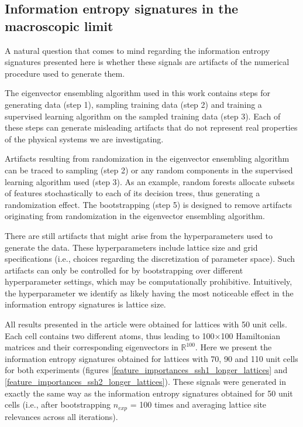 \documentclass[fleqn,10pt]{wlscirep}
\begin{document}
\subsection*{Information entropy signatures in the macroscopic limit}

A natural question that comes to mind regarding the information entropy signatures presented here is whether these signals are artifacts of the numerical procedure used to generate them.

The eigenvector ensembling algorithm used in this work contains steps for generating data (step 1), sampling training data (step 2) and training a supervised learning algorithm on the sampled training data (step 3). Each of these steps can generate misleading artifacts that do not represent real properties of the physical systems we are investigating.

Artifacts resulting from randomization in the eigenvector ensembling algorithm can be traced to sampling (step 2) or any random components in the supervised learning algorithm used (step 3). As an example, random forests allocate subsets of features stochastically to each of its decision trees, thus generating a randomization effect. The bootstrapping (step 5) is designed to remove artifacts originating from randomization in the eigenvector ensembling algorithm.

There are still artifacts that might arise from the hyperparameters used to generate the data. These hyperparameters include lattice size and grid specifications (i.e., choices regarding the discretization of parameter space). Such artifacts can only be controlled for by bootstrapping over different hyperparameter settings, which may be computationally prohibitive. Intuitively, the hyperparameter we identify as likely having the most noticeable effect in the information entropy signatures is lattice size.

All results presented in the article were obtained for lattices with 50 unit cells. Each cell contains two different atoms, thus leading to 100$\times$100 Hamiltonian matrices and their corresponding eigenvectors in $\mathbb{R}^{100}$. Here we present the information entropy signatures obtained for lattices with 70, 90 and 110 unit cells for both experiments (figures \ref{feature_importances_ssh1_longer_lattices} and \ref{feature_importances_ssh2_longer_lattices}). These signals were generated in exactly the same way as the information entropy signatures obtained for 50 unit cells (i.e., after bootstrapping $n_{exp}$ = 100 times and averaging lattice site relevances across all iterations).
\end{document}
